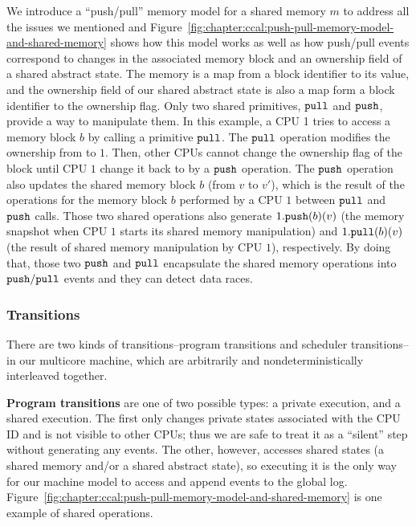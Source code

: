 We introduce a ``push/pull'' memory model for a shared memory $m$ to address all the issues we mentioned and 
Figure~\ref{fig:chapter:ccal:push-pull-memory-model-and-shared-memory} shows 
how this model works as well as how push/pull events correspond to changes in the associated memory block and an ownership field of a shared abstract state.
The memory is a map from a block identifier to its value,
and the ownership field of our shared abstract state is also a map form a block identifier to the ownership flag.
Only two shared primitives, ${\mathrm{\texttt{pull}}}$ and ${\mathrm{\texttt{push}}}$,
provide a way to manipulate them.
In this example, a CPU 1 tries to access a memory block $b$ by calling a primitive ${\mathrm{\texttt{pull}}}$. 
The ${\mathrm{\texttt{pull}}}$ operation modifies the ownership from  to  $1$. 
Then, other CPUs cannot change the ownership flag of the block until CPU $1$ change it back to  
by a ${\mathrm{\texttt{push}}}$ operation.
The ${\mathrm{\texttt{push}}}$ operation also updates the shared memory block $b$ (from $v$ to $v'$), which is the result of the operations for the memory block $b$ performed by a CPU $1$  between ${\mathrm{\texttt{pull}}}$ and ${\mathrm{\texttt{push}}}$ calls. 
Those two shared operations also generate $1.{\mathrm{\texttt{push}}}(b)(v)$ (the memory snapshot when CPU $1$ starts its shared memory manipulation) 
and  $1.{\mathrm{\texttt{pull}}}(b)(v)$ (the result of shared memory manipulation by CPU $1$), respectively.
By doing that, those two ${\mathrm{\texttt{push}}}$ and ${\mathrm{\texttt{pull}}}$ encapsulate the shared memory operations
into ${\mathrm{\texttt{push}}}/{\mathrm{\texttt{pull}}}$ events and they can detect data races.

\subsubsection{Transitions}

There are two kinds of transitions--program transitions and scheduler transitions--in our multicore machine,
which are arbitrarily and nondeterministically interleaved together.


\textbf{Program transitions} are one of two possible types:
a private execution, and a shared execution.
The first only changes private states associated with the CPU ID and is not visible to other CPUs;
thus we are safe to treat it as a ``silent'' step without generating any events. 
The other, however, 
accesses shared states (a shared memory and/or a shared abstract state),
so executing it is  the only way for our machine model  to access and append events to the global log.
Figure~\ref{fig:chapter:ccal:push-pull-memory-model-and-shared-memory} is one example of shared operations.

